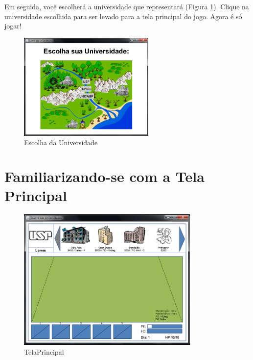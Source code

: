 \documentclass[brazil,times]{abnt}
\begin{document}
Em seguida, você escolherá a universidade que representará
(Figura \ref{escolha-universidade}). Clique na universidade escolhida para ser
levado para a tela principal do jogo. Agora é só jogar!

\begin{figure}[htp]
\begin{center}
  \includegraphics[width=0.6\textwidth]{img/Figura3manual.PNG}
  \caption[Escolha da Universidade]{Escolha da Universidade}
  \label{escolha-universidade}
\end{center}
\end{figure}

\section{Familiarizando-se com a Tela Principal}
	\begin{figure}[htp]
	\begin{center}
	  \includegraphics[width=0.8\textwidth]{img/Figura4manual.PNG}
	  \caption[Tela Principal]{TelaPrincipal}
	  \label{tela-principal}
	\end{center}
	\end{figure}
\end{document}

